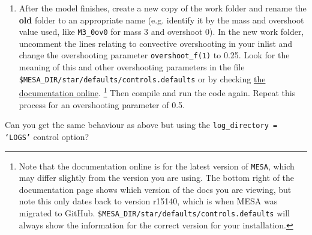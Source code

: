 \documentclass[11pt,a4paper]{article}
\begin{document}
\begin{enumerate}
\begin{enumerate}
    \item After the model finishes, create a new copy of the work folder and rename the \textbf{old} folder to an appropriate name (e.g. identify it by the mass and overshoot value used, like \verb|M3_0ov0| for mass 3 and overshoot 0). 
    In the new work folder, uncomment the lines relating to convective overshooting in your inlist and change the overshooting parameter \verb|overshoot_f(1)| to 0.25. 
    Look for the meaning of this and other overshooting parameters in the file \verb|$MESA_DIR/star/defaults/controls.defaults| or by checking \href{https://docs.mesastar.org/en/latest/reference/controls.html}{the documentation online}.
    \footnote{Note that the documentation online is for the latest version of \texttt{MESA}, which may differ slightly from the version you are using. The bottom right of the documentation page shows which version of the docs you are viewing, but note this only dates back to version r15140, which is when MESA was migrated to GitHub.
    \texttt{\$MESA\_DIR/star/defaults/controls.defaults} will always show the information for the correct version for your installation.}
    Then compile and run the code again.  Repeat this process for an overshooting parameter of 0.5.

\end{enumerate}


\begin{tcolorbox}[protipbox]
Can you get the same behaviour as above but using the \texttt{log\_directory = `LOGS'} control option?
\end{tcolorbox}



\end{enumerate}
\end{document}
